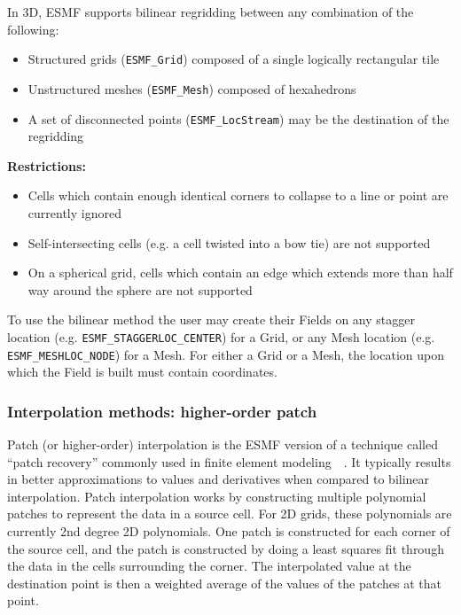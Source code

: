 \smallskip

 In 3D, ESMF supports bilinear regridding between any combination of the following:
 \begin{itemize}
 \item Structured grids ({\tt ESMF\_Grid}) composed of a single logically rectangular tile
 \item Unstructured meshes ({\tt ESMF\_Mesh}) composed of hexahedrons 
 \item A set of disconnected points ({\tt ESMF\_LocStream}) may be the destination of the regridding
 \end{itemize}

\smallskip

{\bf Restrictions:}
 \begin{itemize}
 \item Cells which contain enough identical corners to collapse to a line or point are currently ignored
 \item Self-intersecting cells (e.g. a cell twisted into a bow tie) are not supported 
 \item On a spherical grid, cells which contain an edge which extends more than half way around the sphere are not supported 
 \end{itemize}

 To use the bilinear method the user may create their Fields on any stagger location (e.g. {\tt ESMF\_STAGGERLOC\_CENTER}) for a Grid, or
 any Mesh location (e.g. {\tt ESMF\_MESHLOC\_NODE}) for a Mesh. For either a Grid or a Mesh, the location upon which the Field is built 
 must contain coordinates. 

\subsubsection{Interpolation methods: higher-order patch}\label{sec:interpolation:patch}

 Patch (or higher-order) interpolation is the ESMF version of a technique called ``patch recovery'' commonly
 used in finite element modeling~\cite{PatchInterp1}~\cite{PatchInterp2}. It typically results in better approximations to 
 values and derivatives when compared to bilinear interpolation.
 Patch interpolation works by constructing multiple polynomial patches to represent
 the data in a source cell. For 2D grids, these polynomials
 are currently 2nd degree 2D polynomials. One patch is constructed for each corner of the source cell, and the patch is constructed 
 by doing a least squares fit through the data in the cells surrounding the corner. The interpolated value at the destination point is 
 then a weighted average of the values of the patches at that point. 

